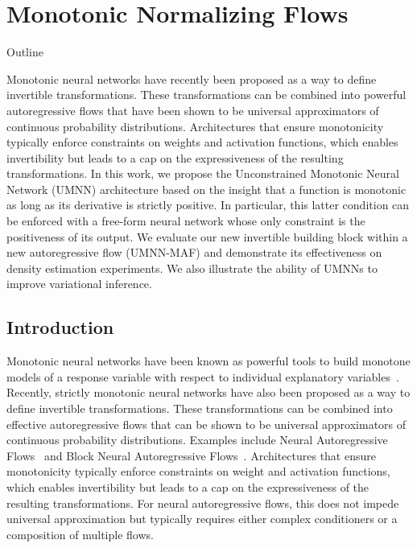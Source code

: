 \chapter{Monotonic Normalizing Flows}\label{ch:05}

\begin{remark}{Outline}

Monotonic neural networks have recently been proposed as a way to define invertible transformations.
These transformations can be combined into powerful autoregressive flows that have been shown to be universal approximators of continuous probability distributions.
Architectures that ensure monotonicity typically enforce constraints on weights and activation functions, which enables invertibility but leads to a cap on the expressiveness of the resulting transformations.
In this work, we propose the Unconstrained Monotonic Neural Network (UMNN) architecture based on the insight that a function is monotonic as long as its derivative is strictly positive. In particular, this latter condition can be enforced with a free-form neural network whose only constraint is the positiveness of its output.
We evaluate our new invertible building block within a new autoregressive flow (UMNN-MAF) and demonstrate its effectiveness on density estimation experiments.
We also illustrate the ability of UMNNs to improve variational inference.
\end{remark}


\section{Introduction}

Monotonic neural networks have been known as powerful tools to build monotone models of a response variable with respect to individual explanatory variables~\citep{archer_application_1993, sill_monotonic_1998, daniels2010monotone, gupta_monotonic_2016, you_deep_2017}. Recently, strictly monotonic neural networks have also been proposed as a way to define invertible transformations. These transformations can be combined into effective autoregressive flows that can be shown to be universal approximators of continuous probability distributions. Examples include Neural Autoregressive Flows~\citep[NAF, ][]{huang_neural_2018} and Block Neural Autoregressive Flows~\citep[B-NAF, ][]{de_cao_block_2020}. Architectures that ensure monotonicity typically enforce constraints on weight and activation functions, which enables invertibility but %
leads to a cap on the expressiveness of the resulting transformations.
For neural autoregressive flows, this does not impede universal approximation but typically requires either complex conditioners or a composition of multiple flows.

